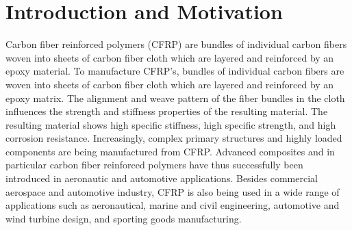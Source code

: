 


\section{Introduction and Motivation}
\label{sec:intro}



Carbon fiber reinforced polymers (CFRP) are bundles of individual carbon fibers
woven into sheets of carbon fiber cloth which are layered
and reinforced by an epoxy material.
To manufacture CFRP's, bundles of individual carbon fibers are woven into sheets of carbon fiber cloth which are layered and reinforced by an epoxy matrix. The alignment and weave pattern of the fiber bundles in the cloth influences the strength and stiffness properties of the resulting material. The resulting material shows high specific stiffness, high specific strength, and high corrosion resistance. 
Increasingly, complex primary structures and highly loaded components are being manufactured from CFRP.
Advanced composites and in particular carbon fiber reinforced polymers have thus successfully been introduced in aeronautic and automotive applications. Besides commercial aerospace and automotive industry, CFRP is also being used
in a wide range of applications such as aeronautical, marine and civil engineering, automotive and wind turbine design,
and sporting goods manufacturing.



